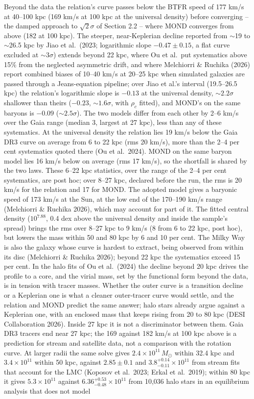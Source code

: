 \documentclass[
  10pt,
]{article}
\begin{document}
Beyond the data the relation's curve passes below the BTFR speed of 177 km/s at 40--100 kpc (169 km/s at 100 kpc at the universal density) before converging -- the damped approach to $\sqrt{2}\sigma$ of Section 2.2 -- where MOND converges from above (182 at 100 kpc). The steeper, near-Keplerian decline reported from $\sim$19 to $\sim$26.5 kpc by Jiao et al.~(2023; logarithmic slope $-0.47\pm0.15$, a flat curve excluded at $\sim3\sigma$) extends beyond 22 kpc, where Ou et al.\ put systematics above 15\% from the neglected asymmetric drift, and where Melchiorri \& Ruchika (2026) report combined biases of 10--40 km/s at 20--25 kpc when simulated galaxies are passed through a Jeans-equation pipeline; over Jiao et al.'s interval (19.5--26.5 kpc) the relation's logarithmic slope is $-0.13$ at the universal density, $\sim2.2\sigma$ shallower than theirs ($-0.23$, $\sim1.6\sigma$, with $\rho_c$ fitted), and MOND's on the same baryons is $-0.09$ ($\sim2.5\sigma$). The two models differ from each other by 2--6 km/s over the Gaia range (median 3, largest at 27 kpc), less than any of these systematics. At the universal density the relation lies 19 km/s below the Gaia DR3 curve on average from 6 to 22 kpc (rms 20 km/s), more than the 2--4 per cent systematics quoted there (Ou et al.~2024). MOND on the same baryon model lies 16 km/s below on average (rms 17 km/s), so the shortfall is shared by the two laws. These 6--22 kpc statistics, over the range of the 2--4 per cent systematics, are post hoc; over 8--27 kpc, declared before the run, the rms is 20 km/s for the relation and 17 for MOND. The adopted model gives a baryonic speed of 173 km/s at the Sun, at the low end of the 170--190 km/s range (Melchiorri \& Ruchika 2026), which may account for part of it. The fitted central density ($10^{7.88}$, 0.4 dex above the universal density and inside the sample's spread) brings the rms over 8--27 kpc to 9 km/s (8 from 6 to 22 kpc, post hoc), but lowers the mass within 50 and 80 kpc by 6 and 10 per cent. The Milky Way is also the galaxy whose curve is hardest to extract, being observed from within its disc (Melchiorri \& Ruchika 2026); beyond 22 kpc the systematics exceed 15 per cent. In the halo fits of Ou et al.~(2024) the decline beyond 20 kpc drives the profile to a core, and the virial mass, set by the functional form beyond the data, is in tension with tracer masses. Whether the outer curve is a transition decline or a Keplerian one is what a cleaner outer-tracer curve would settle, and the relation and MOND predict the same answer; halo stars already argue against a Keplerian one, with an enclosed mass that keeps rising from 20 to 80 kpc (DESI Collaboration 2026). Inside 27 kpc it is not a discriminator between them. Gaia DR3 tracers end near 27 kpc; the 169 against 182 km/s at 100 kpc above is a prediction for stream and satellite data, not a comparison with the rotation curve. At larger radii the same solve gives $2.4\times10^{11}\,M_\odot$ within 32.4 kpc and $3.4\times10^{11}$ within 50 kpc, against $2.85\pm0.1$ and $3.8^{+0.14}_{-0.11}\times10^{11}$ from stream fits that account for the LMC (Koposov et al.~2023; Erkal et al.~2019); within 80 kpc it gives $5.3\times10^{11}$ against $6.36^{+0.53}_{-0.48}\times10^{11}$ from 10,036 halo stars in an equilibrium analysis that does not model 
\end{document}
